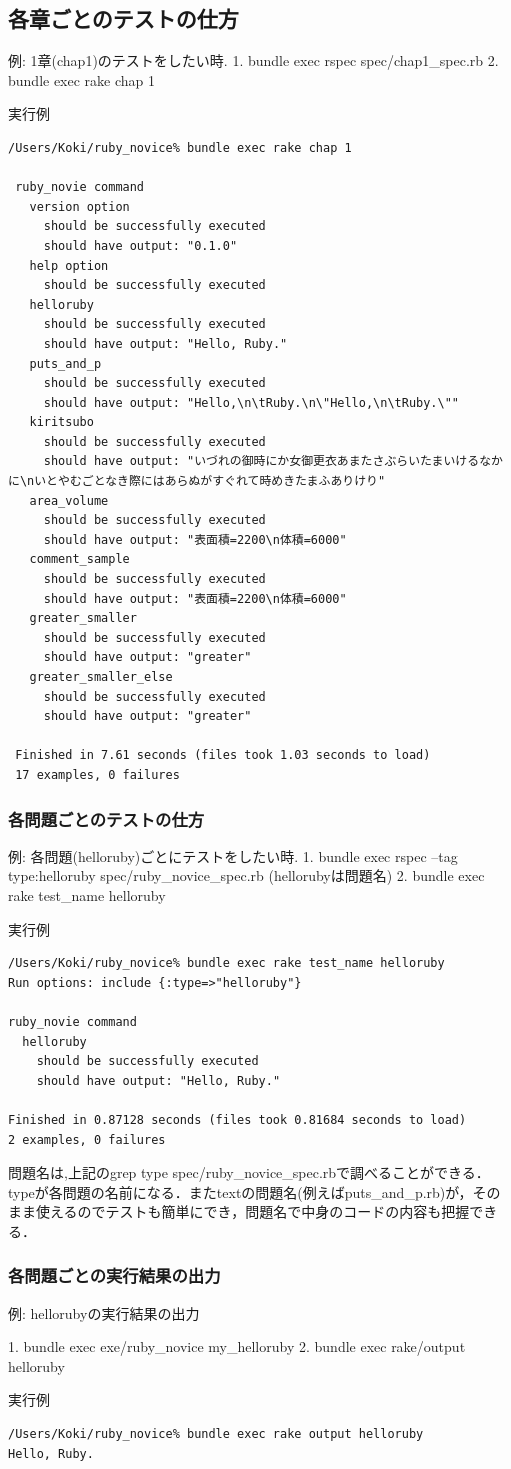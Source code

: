 \subsection{各章ごとのテストの仕方}
例: 1章(chap1)のテストをしたい時.
1. bundle exec rspec spec/chap1\_spec.rb 
2. bundle exec rake chap 1

実行例
\begin{lstlisting}[style=customRuby]
 /Users/Koki/ruby_novice% bundle exec rake chap 1   
 
 ruby_novie command
   version option
     should be successfully executed
     should have output: "0.1.0"
   help option
     should be successfully executed
   helloruby
     should be successfully executed
     should have output: "Hello, Ruby."
   puts_and_p
     should be successfully executed
     should have output: "Hello,\n\tRuby.\n\"Hello,\n\tRuby.\""
   kiritsubo
     should be successfully executed
     should have output: "いづれの御時にか女御更衣あまたさぶらいたまいけるなかに\nいとやむごとなき際にはあらぬがすぐれて時めきたまふありけり"
   area_volume
     should be successfully executed
     should have output: "表面積=2200\n体積=6000"
   comment_sample
     should be successfully executed
     should have output: "表面積=2200\n体積=6000"
   greater_smaller
     should be successfully executed
     should have output: "greater"
   greater_smaller_else
     should be successfully executed
     should have output: "greater"
		 
 Finished in 7.61 seconds (files took 1.03 seconds to load)
 17 examples, 0 failures
\end{lstlisting}
\subsubsection{各問題ごとのテストの仕方}
例: 各問題(helloruby)ごとにテストをしたい時.
1. bundle exec rspec --tag type:helloruby spec/ruby\_novice\_spec.rb  (hellorubyは問題名)
2. bundle exec rake test\_name helloruby

実行例
\begin{lstlisting}[style=customRuby]
/Users/Koki/ruby_novice% bundle exec rake test_name helloruby
Run options: include {:type=>"helloruby"}

ruby_novie command
  helloruby
    should be successfully executed
    should have output: "Hello, Ruby."
		 
Finished in 0.87128 seconds (files took 0.81684 seconds to load)
2 examples, 0 failures
\end{lstlisting}
問題名は,上記のgrep type spec/ruby\_novice\_spec.rbで調べることができる．
typeが各問題の名前になる．またtextの問題名(例えばputs\_and\_p.rb)が，そのまま使えるのでテストも簡単にでき，問題名で中身のコードの内容も把握できる．

\subsubsection{各問題ごとの実行結果の出力}
例: hellorubyの実行結果の出力

1. bundle exec exe/ruby\_novice my\_helloruby
2. bundle exec rake/output helloruby

実行例
\begin{lstlisting}[style=customRuby]
/Users/Koki/ruby_novice% bundle exec rake output helloruby
Hello, Ruby.
\end{lstlisting}
